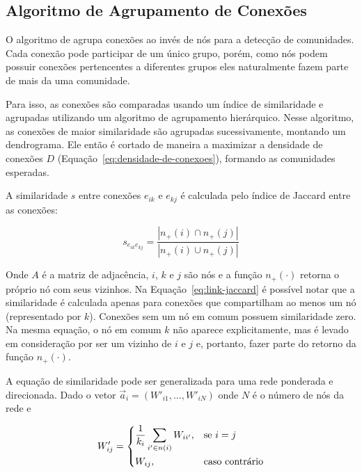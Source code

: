 \documentclass[
  article,
  11pt,
  a4paper,
  english,
  brazil,
  sumario=tradicional]{abntex2}
\begin{document}
\subsection{Algoritmo de Agrupamento de Conexões}

O algoritmo de  agrupa conexões ao invés de nós para a detecção de comunidades. Cada conexão pode participar de um único grupo, porém, como nós podem possuir conexões pertencentes a diferentes grupos eles naturalmente fazem parte de mais da uma comunidade.

Para isso, as conexões são comparadas usando um índice de similaridade e agrupadas utilizando um algoritmo de agrupamento hierárquico. Nesse algoritmo, as conexões de maior similaridade são agrupadas sucessivamente, montando um dendrograma. Ele então é cortado de maneira a maximizar a densidade de conexões $D$ (Equação~\ref{eq:densidade-de-conexoes}), formando as comunidades esperadas.

A similaridade $s$ entre conexões $e_{ik}$ e $e_{kj}$ é calculada pelo índice de Jaccard entre as conexões:

\begin{equation} \label{eq:link-jaccard}
s_{e_{ik} e_{kj}} = \frac{|n_+(i) \cap n_+(j)|}{|n_+(i) \cup n_+(j)|}
\end{equation}

Onde $A$ é a matriz de adjacência, $i$, $k$ e $j$ são nós e a função $n_+(\cdot)$ retorna o próprio nó com seus vizinhos. Na Equação~\ref{eq:link-jaccard} é possível notar que a similaridade é calculada apenas para conexões que compartilham ao menos um nó (representado por $k$). Conexões sem um nó em comum possuem similaridade zero. Na mesma equação, o nó em comum $k$ não aparece explicitamente, mas é levado em consideração por ser um vizinho de $i$ e $j$ e, portanto, fazer parte do retorno da função $n_+(\cdot)$.

A equação de similaridade pode ser generalizada para uma rede ponderada e direcionada. Dado o vetor $\vec{a}_i = (W'_{i1}, \ldots, W'_{iN})$ onde $N$ é o número de nós da rede e

\begin{equation}
W'_{ij} = \begin{dcases}
            \frac{1}{k_i} \sum_{i' \in n(i)} W_{ii'}, & \text{se $i = j$} \\
            W_{ij}, & \text{caso contrário}
          \end{dcases}
\end{equation}
\end{document}
